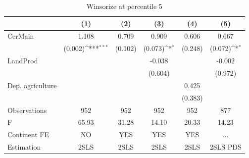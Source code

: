\documentclass[12pt,a4paper]{article}
\begin{document}
\begin{table}[htbp]\centering
\def\sym#1{\ifmmode^{#1}\else\(^{#1}\)\fi}
\caption{Winsorize at percentile 5}
\begin{tabular}{l*{5}{c}}
\hline\hline
                &\multicolumn{1}{c}{(1)}         &\multicolumn{1}{c}{(2)}         &\multicolumn{1}{c}{(3)}         &\multicolumn{1}{c}{(4)}         &\multicolumn{1}{c}{(5)}         \\
\hline
CerMain         &    1.108         &    0.709         &    0.909         &    0.606         &    0.667         \\
                &  (0.002)\sym{***}&  (0.102)         &  (0.073)\sym{*}  &  (0.248)         &  (0.072)\sym{*}  \\
LandProd        &                  &                  &   -0.038         &                  &   -0.002         \\
                &                  &                  &  (0.604)         &                  &  (0.972)         \\
Dep. agriculture&                  &                  &                  &    0.425         &                  \\
                &                  &                  &                  &  (0.383)         &                  \\
\hline
Observations    &      952         &      952         &      952         &      952         &      877         \\
F               &    65.93         &    31.28         &    14.10         &    20.33         &    14.23         \\
Continent FE    &       NO         &      YES         &      YES         &      YES         &      ...         \\
Estimation      &     2SLS         &     2SLS         &     2SLS         &     2SLS         & 2SLS PDS         \\
\hline\hline
\end{tabular}
\end{table}
\end{document}
